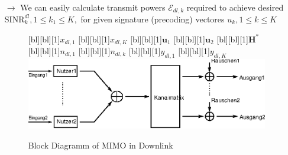 \documentclass[a4paper, 10pt]{article}
\begin{document}
\begin{itemize}
\begin{align*}
	\end{align*}
	\item[$\rightarrow$] We can easily calculate transmit powers $\mathcal{E}_{dl,k} $ required to achieve desired $\text{SINR}_k^{dl}, 1\leq k_1\leq K, $ for given signature (precoding) vectores $u_k, 1\leq k\leq K $ 
	\begin{figure}[ht]
		\centering	
		[bl][bl][1]{$x_{dl,1} $}
		[bl][bl][1]{$x_{dl,K} $}
		[bl][bl][1]{$\mathbf{u}_1 $}
		[bl][bl][1]{$\mathbf{u}_2 $}
		[bl][bl][1]{$\mathbf{H}^* $}
		[bl][bl][1]{$n_{dl,1} $}
		[bl][bl][1]{$n_{dl,k} $}
		[bl][bl][1]{$y_{dl,1} $}
		[bl][bl][1]{$y_{dl,K} $}
		\includegraphics[scale=0.8]{Downlink_MIMO}	
		\caption{Block Diagramm of MIMO in Downlink}	
		\label{fig:Downlink_MIMO}
	\end{figure}
\end{itemize}
\end{document}
